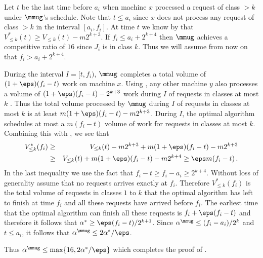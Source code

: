 Let $t$ be the last time before $a_i$ when machine $x$ processed a request
of class $> k$ under $\mmug$'s schedule. Note that $t \leq a_i$ since $x$ does not process any
request of class $> k$ in the interval $[a_i,f_i]$. At time $t$ we
know by  that $V^*_{\leq k} (t) \geq
V_{\leq k} (t) - m2^{k+3}$. If $f_i \le a_i + 2^{k+4}$ then $\mmug$
achieves a competitive ratio of $16$ since $J_i$ is in class
$k$. Thus we will assume from now on that $f_i > a_i + 2^{k+4}$.

During the interval $I = [t, f_i)$, $\mmug$ completes a total volume of
$(1 + \eps)(f_i - t)$ work on machine $x$. Using , any
other machine $y$ also processes a volume of $(1+\eps)(f_i-t) -
2^{k+3}$ work during $I$ of requests in classes at most $k$ . Thus the total volume processed by $\mmug$ during $I$ of requests in classes at most $ k$ is at least $m(1+\eps)(f_i-t) -
m2^{k+3}$.  During $I$, the optimal algorithm schedules at most a
$m(f_i-t)$ volume of work for requests in classes at most $k$.  Combining this with
, we see that
\begin{eqnarray*}
V^*_{\le k}(f_i) & \ge & V_{\le k}(t) - m2^{k+3} + m(1+\eps)(f_i-t)  - m2^{k+3} \\
  & \ge & V_{\le k}(t) + m(1+\eps)(f_i-t) - m2^{k+4} \ge   \eps m (f_i - t)\,.
\end{eqnarray*}
In the last inequality we use the fact that $f_i-t \ge f_i -
a_i \ge 2^{k+4}$. Without loss of generality assume that no
requests arrives exactly at $f_i$. Therefore $V^*_{\le k}(f_i)$ is the
total volume of requests in classes $1$ to $k$ that the optimal
algorithm has left to finish at time $f_i$ and all these requests have
arrived before $f_i$. The earliest time that the optimal algorithm can
finish all these requests is $f_i + \eps (f_i-t)$ and therefore it
follows that $\alpha^* \ge \eps (f_i - t)/2^{k+1}$. Since $\alpha^\mmug \le (f_i-a_i)/2^k$ and $t \leq a_i$, it follows that $\alpha^\mmug \le 2 \alpha^*/\eps$.

Thus $\alpha^\mmug \le \max\{16, 2\alpha^*/\eps\}$ which completes the proof
of .

